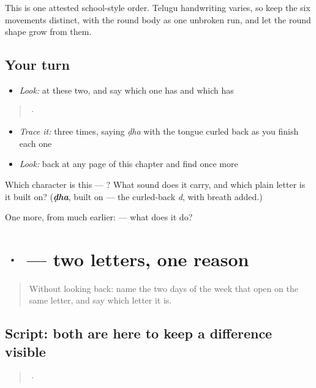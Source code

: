 This is one attested school-style order. Telugu handwriting varies, so keep the six movements distinct, with the round body as one unbroken run, and let the round shape grow from them.

\subsection*{Your turn}
\begin{itemize}
\raggedright
  \item \emph{Look:} at these two, and say which one has  and which has 
\end{itemize}

\begin{quote}
  ·  
\end{quote}

\begin{itemize}
\raggedright
  \item \emph{Trace it:}  three times, saying \emph{ḍha} with the tongue curled back as you finish each one
  \item \emph{Look:} back at any page of this chapter and find  once more
\end{itemize}

\begin{tcolorbox}[breakable,colback=teal!4,colframe=teal!35!black,title={Before you move on}]
Which character is this — ? What sound does it carry, and which plain letter is it built on? (\emph{\textbf{ḍha}}, built on  — the curled-back \emph{d}, with breath added.)

One more, from much earlier:  — what does it do?
\end{tcolorbox}
\section[\texorpdfstring{\te{శ} · \te{ఫ} (śa · pha)}{శ · ఫ (śa · pha)}]{ ·  — two letters, one reason}

\label{lesson:TE-S168-script-recall-split-sounds}



\begin{quote}
Without looking back: name the two days of the week that open on the same letter, and say which letter it is.
\end{quote}

\subsection*{Script: both are here to keep a difference visible}
\begin{quote}
 · 
\end{quote}

